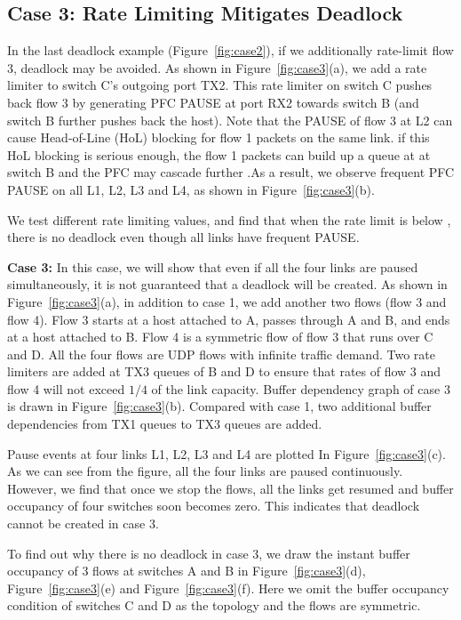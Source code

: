 \subsection{Case 3: Rate Limiting Mitigates Deadlock}

In the last deadlock example (Figure~\ref{fig:case2}), if we additionally rate-limit flow 3, deadlock
may be avoided.  As shown in Figure~\ref{fig:case3}(a), we add a rate limiter to switch C's
outgoing port TX2. This rate limiter on switch C pushes back flow 3 by generating PFC PAUSE
at port RX2 towards switch B (and switch B further pushes back the host). 
Note that the PAUSE of flow 3 at L2 can cause Head-of-Line (HoL) blocking for flow 1 packets on
the same link. if this HoL blocking is serious enough, the flow 1 packets can build up a queue 
at at switch B and the PFC may cascade further .As a result, we 
observe frequent PFC PAUSE on all L1, L2, L3 and L4, as shown in Figure~\ref{fig:case3}(b).


We test different rate limiting values, and find that when the rate limit is below ,
there is no deadlock even though all links have frequent PAUSE. 

\textbf{Case 3:} In this case, we will show that even if all the four links are paused simultaneously, 
it is not guaranteed that a deadlock will be created. As shown in Figure~\ref{fig:case3}(a), in addition 
to case 1, we add another two flows (flow 3 and flow 4). Flow 3 starts at a host attached to A, passes 
through A and B, and ends at a host attached to B. Flow 4 is a symmetric flow of flow 3 that runs over 
C and D. All the four flows are UDP flows with infinite traffic demand. Two rate limiters are added at 
TX3 queues of B and D to ensure that rates of flow 3 and flow 4 will not exceed $1/4$ of the link 
capacity. Buffer dependency graph of case 3 is drawn in Figure~\ref{fig:case3}(b). Compared with case 1, 
two additional buffer dependencies from TX1 queues to TX3 queues are added.

Pause events at four links L1, L2, L3 and L4 are plotted In Figure~\ref{fig:case3}(c).  As we can see 
from the figure, all the four links are paused continuously. However, we find that once we stop the 
flows, all the links get resumed and buffer occupancy of four switches soon becomes zero. This 
indicates that deadlock cannot be created in case 3.

To find out why there is no deadlock in case 3, we draw the instant buffer occupancy of 3 flows at 
switches A and B in Figure~\ref{fig:case3}(d), Figure~\ref{fig:case3}(e) and Figure~\ref{fig:case3}(f). 
Here we omit the buffer occupancy condition of switches C and D as the topology and the flows are symmetric.

